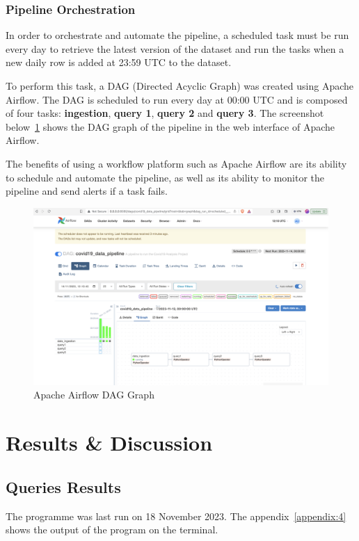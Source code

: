 \documentclass[12pt,oneside]{book} %
\begin{document}
\newpage
\subsection{Pipeline Orchestration}

In order to orchestrate and automate the pipeline, a scheduled task must be run
every day to retrieve the latest version of the dataset and run the tasks when
a new daily row is added at 23:59 UTC to the dataset.\newline

To perform this task, a DAG (Directed Acyclic Graph) was created using Apache
Airflow. The DAG is scheduled to run every day at 00:00 UTC and is composed of
four tasks: \textbf{ingestion}, \textbf{query 1}, \textbf{query 2} and
\textbf{query 3}. The screenshot below~\ref{fig:apache-airflow} shows the DAG
graph of the pipeline in the web interface of Apache Airflow.\newline

The benefits of using a workflow platform such as Apache Airflow are its
ability to schedule and automate the pipeline, as well as its ability to
monitor the pipeline and send alerts if a task fails.

\begin{figure}[h]
    \centering
    \includegraphics[width=1\linewidth]{images/Screenshot 2023-11-14 at 12.10.48.png}
    \caption{Apache Airflow DAG Graph}\label{fig:apache-airflow}
\end{figure}

\newpage
\chapter{Results \& Discussion}

\section{Queries Results}
The programme was last run on 18 November 2023. The appendix~\ref{appendix:4}
shows the output of the program on the terminal.
\end{document}
